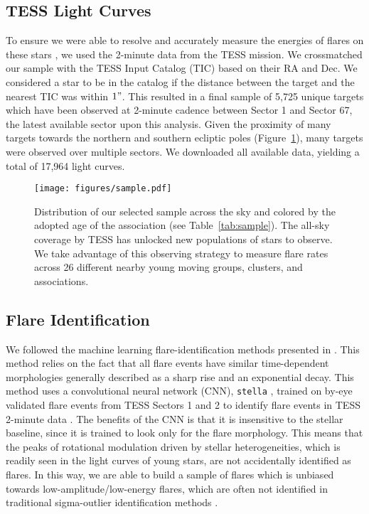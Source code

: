 \documentclass[twocolumn]{aastex631}
\begin{document}
\subsection{TESS Light Curves}

To ensure we were able to resolve and accurately measure the energies of flares
on these stars \citep{howard22}, we used the 2-minute data from the TESS mission.
We crossmatched our sample with the TESS Input Catalog (TIC) based on their RA and Dec.
We considered a star to be in the catalog if the distance between the target and
the nearest TIC was within $1"$. This resulted in a final sample of 5,725 unique targets
which have been observed at 2-minute cadence between Sector 1 and Sector 67, the
latest available sector upon this analysis. Given the proximity of many targets towards the
northern and southern ecliptic poles (Figure~\ref{fig:sample}), many targets were observed
over multiple sectors. We downloaded all available data, yielding a total of 17,964
light curves.

\begin{figure}[ht!]
    \begin{centering}
        \texttt{[image: figures/sample.pdf]}
        \caption{
            Distribution of our selected sample across the sky and colored by the
            adopted age of the association (see Table~\ref{tab:sample}). The all-sky
            coverage by TESS has unlocked new populations of stars to observe.
            We take advantage of this observing strategy to measure flare rates
            across 26 different nearby young moving groups, clusters, and associations.
        }
        \label{fig:sample}
    \end{centering}
\end{figure}


\subsection{Flare Identification}

We followed the machine learning flare-identification methods presented in
\cite{feinstein20a}. This method relies on the fact that all flare events
have similar time-dependent morphologies generally described as a sharp rise
and an exponential decay. This method uses a convolutional neural network (CNN),
\texttt{stella} \citep{feinstein20b}, trained on by-eye validated flare events from
TESS Sectors 1 and 2 to identify flare events in TESS 2-minute data
\citep{guenther19_flares, feinstein20a}. The benefits of the CNN is that it is
insensitive to the stellar baseline, since it is trained to look only for the
flare morphology. This means that the peaks of rotational modulation driven by
stellar heterogeneities, which is readily seen in the light curves of young stars,
are not accidentally identified as flares. In this way, we are able to
build a sample of flares which is unbiased towards low-amplitude/low-energy flares,
which are often not identified in traditional sigma-outlier identification
methods \citep{chang15}.
\end{document}
